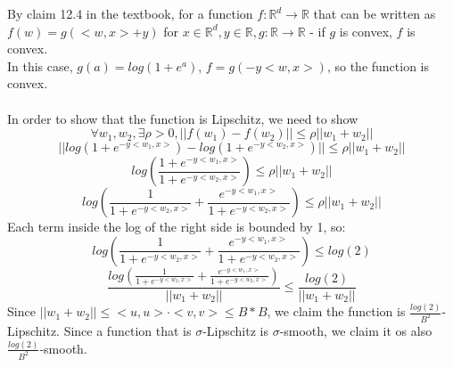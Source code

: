 \documentclass[11pt, fleqn]{exam}
\newenvironment{mathline}{\begin{adjustwidth}{1cm}{}}{\end{adjustwidth}}
\begin{document}
\begin{questions}
\begin{mathline}
By claim 12.4 in the textbook, for a function $f:\mathbb{R}^d\rightarrow \mathbb{R}$ that can be written as $f(w)=g(<w,x>+y)$ for $x\in\mathbb{R}^d, y\in\mathbb{R}, g:\mathbb{R}\rightarrow \mathbb{R}$ - if $g$ is convex, $f$ is convex.\\
In this case, $g(a)=log(1+e^a)$, $f=g(-y<w,x>)$, so the function is convex.\\\\
In order to show that the function is Lipschitz, we need to show $$\forall w_1,w_2, \exists \rho>0, ||f(w_1)-f(w_2)||\leq \rho||w_1+w_2||$$
$$||log(1+e^{-y<w_1,x>})-log(1+e^{-y<w_2,x>})||\leq\rho||w_1+w_2||$$
$$log(\frac{1+e^{-y<w_1,x>}}{1+e^{-y<w_2,x>}})\leq\rho||w_1+w_2||$$
$$log(\frac{1}{1+e^{-y<w_2,x>}}+\frac{e^{-y<w_1,x>}}{1+e^{-y<w_2,x>}})\leq\rho||w_1+w_2||$$
Each term inside the log of the right side is bounded by 1, so:
$$log(\frac{1}{1+e^{-y<w_2,x>}}+\frac{e^{-y<w_1,x>}}{1+e^{-y<w_2,x>}})\leq log(2)$$
$$\frac{log(\frac{1}{1+e^{-y<w_2,x>}}+\frac{e^{-y<w_1,x>}}{1+e^{-y<w_2,x>}})}{||w_1+w_2||}\leq \frac{log(2)}{||w_1+w_2||}$$
Since $||w_1+w_2||\leq <u,u>\cdot<v,v>\leq B*B$, we claim the function is $\frac{log(2)}{B^2}$-Lipschitz. Since a function that is $\sigma$-Lipschitz is $\sigma$-smooth, we claim it os also $\frac{log(2)}{B^2}$-smooth.

\end{mathline}


\end{questions}
\end{document}
